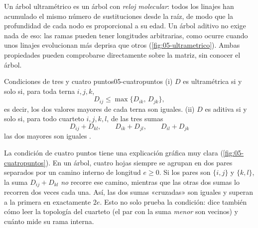 Un árbol ultramétrico es un árbol con \emph{reloj molecular}: todos los linajes han acumulado el mismo número de sustituciones desde la raíz, de modo que la profundidad de cada nodo es proporcional a su edad. Un árbol aditivo no exige nada de eso: las ramas pueden tener longitudes arbitrarias, como ocurre cuando unos linajes evolucionan más deprisa que otros (\cref{fig:05-ultrametrico}). Ambas propiedades pueden comprobarse directamente sobre la matriz, sin conocer el árbol.

\begin{teorema}{Condiciones de tres y cuatro puntos}{05-cuatropuntos}
(i) $D$ es ultramétrica si y solo si, para toda terna $i,j,k$,
\begin{equation}\label{eq:05-trespuntos}
D_{ij} \le \max\{D_{ik},\,D_{jk}\},
\end{equation}
es decir, los dos valores mayores de cada terna son iguales. (ii) $D$ es aditiva si y solo si, para todo cuarteto $i,j,k,l$, de las tres sumas
\begin{equation}\label{eq:05-cuatropuntos}
D_{ij}+D_{kl},\qquad D_{ik}+D_{jl},\qquad D_{il}+D_{jk}
\end{equation}
las dos mayores son iguales \parencite{c05-buneman1974}.
\end{teorema}

\begin{simbolos}
\end{simbolos}

La condición de cuatro puntos tiene una explicación gráfica muy clara (\cref{fig:05-cuatropuntos}). En un árbol, cuatro hojas siempre se agrupan en dos pares separados por un camino interno de longitud $e\ge 0$. Si los pares son $\{i,j\}$ y $\{k,l\}$, la suma $D_{ij}+D_{kl}$ \emph{no} recorre ese camino, mientras que las otras dos sumas lo recorren dos veces cada una. Así, las dos sumas «cruzadas» son iguales y superan a la primera en exactamente $2e$. Esto no solo prueba la condición: dice también cómo leer la topología del cuarteto (el par con la suma \emph{menor} son vecinos) y cuánto mide su rama interna.

